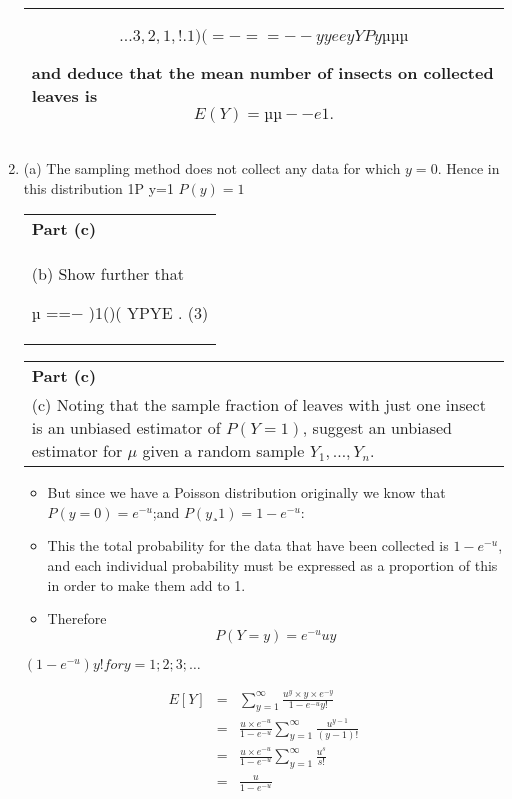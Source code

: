 \documentclass[a4paper,12pt]{article}
\begin{document}
\begin{enumerate}
\begin{table}[ht!]
\begin{tabular}{|p{15cm}|}
\[ ... 3,2,1, ! . 1 )( = − == − − y ye e yYP y µ µ µ\]

and deduce that the mean number of insects on collected leaves is
   \[  E(Y) = 
µ
µ −− e1
. \]
\\ \hline 
   \end{tabular}
 \end{table}
\item  (a) The sampling method does not collect any data for which $y=0$. Hence in this distribution
1P
y=1
$P(y) = 1$
\begin{table}[ht!]
  \centering
  \begin{tabular}{|p{15cm}|}
  \hline  
\noindent \textbf{Part (c)} \\
(b) Show further that 
 
 
µ
==− )1()( YPYE . 
(3) \\
\hline 
   \end{tabular}
 \end{table}

\newpage
  \begin{table}[ht!]
  \centering
  \begin{tabular}{|p{15cm}|}
  \hline  
\noindent \textbf{Part (c)} \\ 
(c) Noting that the sample fraction of leaves with just one insect is an unbiased estimator of $P(Y = 1)$, suggest an unbiased estimator for $\mu$ given a random sample $Y_1,\ldots,Y_n$. \\
\hline 
   \end{tabular}
 \end{table}
\begin{itemize}
\item But since we have a Poisson distribution originally we know that $P(y = 0) =
e^{-u}$;and $P(y ¸ 1) = 1 - e^{-u}$:
\item This the total probability for the data that have been collected is $1-e^{-u}$, and each
individual probability must be expressed as a proportion of this in order to make
them add to 1.
\item 
Therefore \[P(Y = y) = e^{-u}uy\]
\end{itemize}

$(1-e^{-u})y! for y = 1; 2; 3; \ldots$


\begin{eqnarray*}
E[Y] &=& 
\sum^{\infty}_{y=1} \frac{u^{y} \times y \times e^{-y} }{1-e^{-u}y!}\\
&=& \frac{u\times e^{-u}}{1-e^{-u}} \sum^{\infty}_{y=1} \frac{u^{y-1} }{(y-1)!}\\
&=& \frac{u \times e^{-u}}{1-e^{-u}} \sum^{\infty}_{y=1} \frac{u^{s} }{s!}\\
&=& \frac{u}{1-e^{-u}}
\end{eqnarray*}


\end{enumerate}
\end{document}
